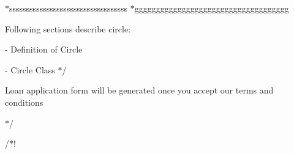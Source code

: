 $\ast$sssssssssssssssssssssssssssssssssss $\ast$gggggggggggggggggggggggggggggggggggg
\begin{DoxyItemize}
\item Following sections describe circle\+:
\item -\/ Definition of Circle
\item -\/ Circle Class $\ast$/
\item Loan application form will be generated once you accept our terms and conditions
\item $\ast$/
\end{DoxyItemize}

/$\ast$! 